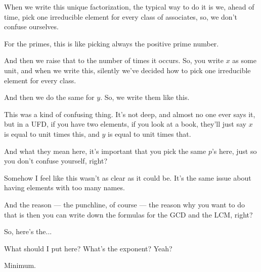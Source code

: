 \begin{speech}[01:21:04 - 01:23:12]

When we write this unique factorization, the typical way to do it is we, ahead of time, pick one irreducible element for every class of associates, so, we don't confuse ourselves.

For the primes, this is like picking always the positive prime number.

And then we raise that to the number of times it occurs. So, you write $x$ as some unit, and when we write this, silently we've decided how to pick one irreducible element for every class.

And then we do the same for $y$. So, we write them like this.

This was a kind of confusing thing. It's not deep, and almost no one ever says it, but in a UFD, if you have two elements, if you look at a book, they'll just say $x$ is equal to unit times this, and $y$ is equal to unit times that.

And what they mean here, it's important that you pick the same $p$'s here, just so you don't confuse yourself, right?

Somehow I feel like this wasn't as clear as it could be. It's the same issue about having elements with too many names.

And the reason --- the punchline, of course --- the reason why you want to do that is then you can write down the formulas for the GCD and the LCM, right?

So, here's the... 
\end{speech}

\begin{speech}[01:23:12 - 01:24:47]

What should I put here? What's the exponent? Yeah?
\end{speech}

\begin{student}
Minimum.
\end{student}

